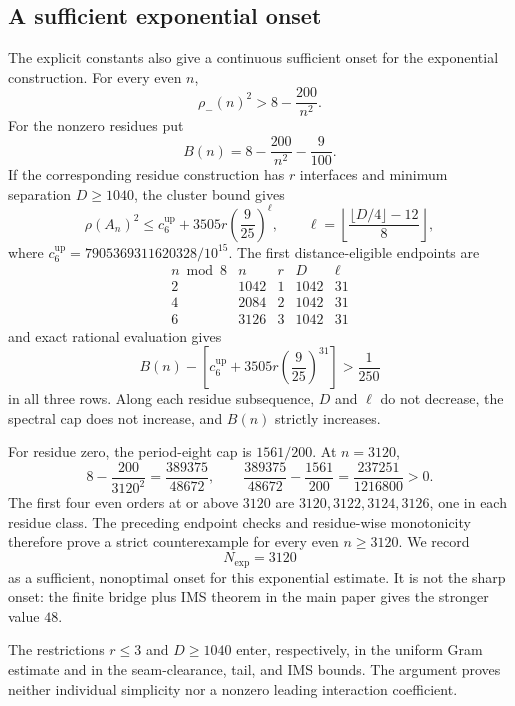\subsection{A sufficient exponential onset}

The explicit constants also give a continuous sufficient onset for the
exponential construction.  For every even \(n\),
\[
\rho_-(n)^2>8-\frac{200}{n^2}.
\]
For the nonzero residues put
\[
B(n)=8-\frac{200}{n^2}-\frac9{100}.
\]
If the corresponding residue construction has \(r\) interfaces and minimum
separation \(D\geq1040\), the cluster bound gives
\[
\rho(A_n)^2
\leq c_6^{\mathrm{up}}
+3505r\left(\frac9{25}\right)^\ell,
\qquad
\ell=\left\lfloor
\frac{\lfloor D/4\rfloor-12}{8}
\right\rfloor,
\]
where \(c_6^{\mathrm{up}}=7905369311620328/10^{15}\).
The first distance-eligible endpoints are
\[
\begin{array}{c|c|c|c|c}
n\bmod8&n&r&D&\ell\\ \hline
2&1042&1&1042&31\\
4&2084&2&1042&31\\
6&3126&3&1042&31
\end{array}
\]
and exact rational evaluation gives
\[
B(n)-\left[
c_6^{\mathrm{up}}
+3505r\left(\frac9{25}\right)^{31}
\right]>\frac1{250}
\]
in all three rows.  Along each residue subsequence, \(D\) and \(\ell\) do
not decrease, the spectral cap does not increase, and \(B(n)\) strictly
increases.

For residue zero, the period-eight cap is \(1561/200\).  At \(n=3120\),
\[
8-\frac{200}{3120^2}=\frac{389375}{48672},
\qquad
\frac{389375}{48672}-\frac{1561}{200}
=\frac{237251}{1216800}>0.
\]
The first four even orders at or above \(3120\) are \(3120,3122,3124,3126\),
one in each residue class.  The preceding endpoint checks and residue-wise
monotonicity therefore prove a strict counterexample for every even
\(n\geq3120\).  We record
\[
N_{\mathrm{exp}}=3120
\]
as a sufficient, nonoptimal onset for this exponential estimate.  It is not
the sharp onset: the finite bridge plus IMS theorem in the main paper gives
the stronger value \(48\).

The restrictions \(r\leq3\) and \(D\geq1040\) enter, respectively, in the
uniform Gram estimate and in the seam-clearance, tail, and IMS bounds.  The
argument proves neither individual simplicity nor a nonzero leading
interaction coefficient.
